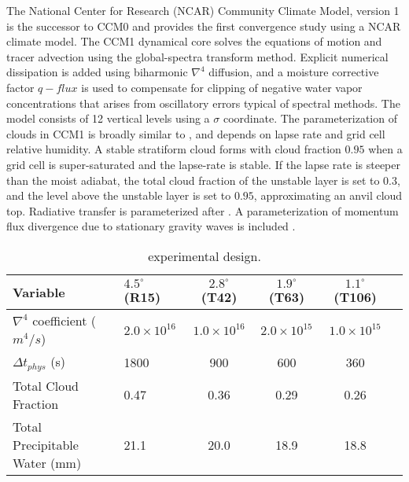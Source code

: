 The National Center for Research (NCAR) Community Climate Model, version 1 \citep{CCM1} is the successor to CCM0 and \cite{KW1991JGR} provides the first convergence study using a NCAR climate model. The CCM1 dynamical core solves the equations of motion and tracer advection using the global-spectra transform method. Explicit numerical dissipation is added using biharmonic $\nabla^{4}$ diffusion, and a moisture corrective factor $q-flux$ is used to compensate for clipping of negative water vapor concentrations that arises from oscillatory errors typical of spectral methods. The model consists of 12 vertical levels using a $\sigma$ coordinate. The parameterization of clouds in CCM1 is broadly similar to \citep{METAL1965MWR}, and depends on lapse rate and grid cell relative humidity. A stable stratiform cloud forms with cloud fraction $0.95$  when a grid cell is super-saturated and the lapse-rate is stable. If the lapse rate is steeper than the moist adiabat, the total cloud fraction of the unstable layer is set to $0.3$, and the level above the unstable layer is set to $0.95$, approximating an anvil cloud top. Radiative transfer is parameterized after \cite{CCM1RAD}. A parameterization of momentum flux divergence due to stationary gravity waves is included \citep{M1987JAS}. 

 \begin{table}
 \caption{\cite{KW1991JGR} experimental design.}
 \centering
 \begin{tabular}{llcccc}
 \hline
 Variable & $4.5^{\circ}$ (R15) & $2.8^{\circ}$ (T42) & $1.9^{\circ}$ (T63)  & $1.1^{\circ}$ (T106) \\
 \hline
   $\nabla^{4}$ coefficient ($m^4/s$) & $2.0 \times 10^{16}$ & $1.0 \times 10^{16}$ & $2.0 \times 10^{15}$ & $1.0 \times 10^{15}$ \\
   $\Delta t_{phys}$ (s) & 1800 & 900 & 600 & 360 \\
   Total Cloud Fraction & 0.47 & 0.36 & 0.29 & 0.26 \\
   Total Precipitable Water (mm) & 21.1 & 20.0 & 18.9 & 18.8 \\
 \hline
 \end{tabular}
 \label{tbl:table1-1}
 \end{table}


